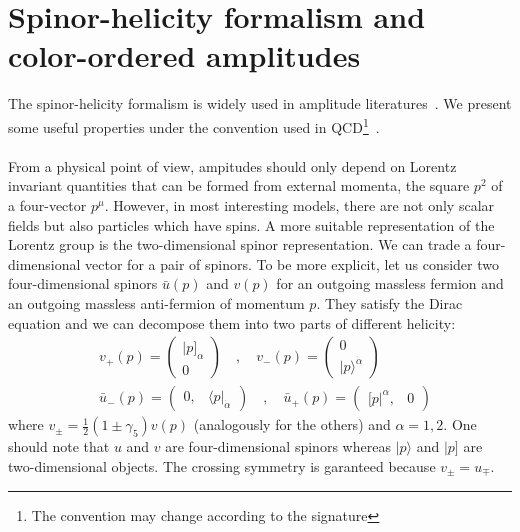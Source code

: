 \section{Spinor-helicity formalism and color-ordered amplitudes}\label{sect-spinor}
The spinor-helicity formalism is widely used in amplitude literatures~\cite{Dixon:1996wi,Elvang:2013cua}.
We present some useful properties under the convention used in QCD\footnote{The convention may change according to the signature}~\cite{Dixon:1996wi}.
\\\\
From a physical point of view, ampitudes should only depend on Lorentz invariant quantities that can be formed from external momenta, \eg the square $p^2$ of a four-vector $p^\mu$.
However, in most interesting models, there are not only scalar fields but also particles which have spins. 
A more suitable representation of the Lorentz group is the two-dimensional spinor representation.
We can trade a four-dimensional vector for a pair of spinors.
To be more explicit, let us consider two four-dimensional spinors $\bar{u}(p)$ and $v(p)$ for an outgoing massless fermion and an outgoing massless anti-fermion of momentum $p$.
They satisfy the Dirac equation and we can decompose them into two parts of different helicity:
\begin{equation}
\begin{split}
& v_+(p) = \begin{pmatrix}
|p]_\alpha \\ 0
\end{pmatrix} %
\quad,\quad
v_-(p) = \begin{pmatrix}
0 \\ |p\rangle^{\dot{\alpha}}
\end{pmatrix} %
\\
& \bar{u}_-(p) = \begin{pmatrix} 
0, & \langle p |_{\dot{\alpha}}\end{pmatrix}
\quad,\quad
\bar{u}_+(p) = \begin{pmatrix} [ p|^\alpha, & 0 \end{pmatrix}
\end{split}
\end{equation} 
where $v_\pm = \frac{1}{2}(1\pm\gamma_5)v(p)$ (analogously for the others) and $\alpha = 1,2$.
One should note that $u$ and $v$ are four-dimensional spinors whereas $|p\rangle$ and $|p]$ are two-dimensional objects. 
The crossing symmetry is garanteed because $v_\pm = u_\mp$.
\\
